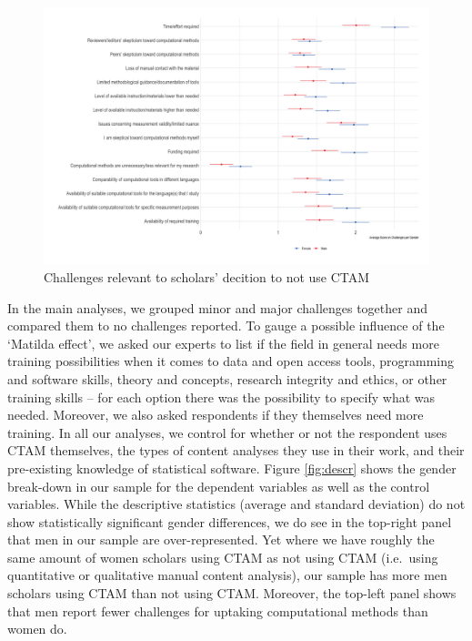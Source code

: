 \documentclass[
]{ccr}
\begin{document}
\begin{figure}[t]

{\centering \includegraphics[width=1\textwidth,height=\textheight]{figures/challenges-distribution-2.png}

}

\caption{\label{fig:challenge2}Challenges relevant to scholars' decition
to not use CTAM}

\end{figure}

In the main analyses, we grouped minor and major challenges together and
compared them to no challenges reported. To gauge a possible influence
of the `Matilda effect', we asked our experts to list if the field in
general needs more training possibilities when it comes to data and open
access tools, programming and software skills, theory and concepts,
research integrity and ethics, or other training skills -- for each
option there was the possibility to specify what was needed. Moreover,
we also asked respondents if they themselves need more training. In all
our analyses, we control for whether or not the respondent uses CTAM
themselves, the types of content analyses they use in their work, and
their pre-existing knowledge of statistical software. Figure
\ref{fig:descr} shows the gender break-down in our sample for the
dependent variables as well as the control variables. While the
descriptive statistics (average and standard deviation) do not show
statistically significant gender differences, we do see in the top-right
panel that men in our sample are over-represented. Yet where we have
roughly the same amount of women scholars using CTAM as not using CTAM
(i.e.~using quantitative or qualitative manual content analysis), our
sample has more men scholars using CTAM than not using CTAM. Moreover,
the top-left panel shows that men report fewer challenges for uptaking
computational methods than women do.
\end{document}
